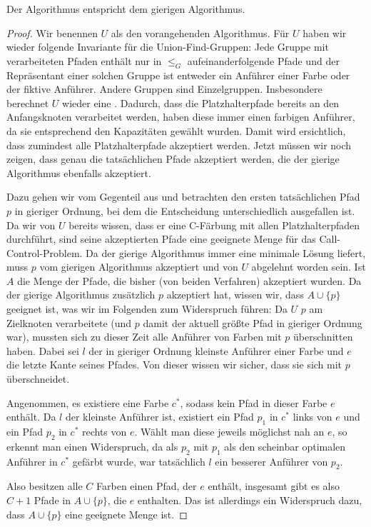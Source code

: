 \begin{lemma}
    Der  Algorithmus entspricht dem gierigen Algorithmus.
\end{lemma}
\begin{proof}
    Wir benennen $U$ als den vorangehenden Algorithmus.
    Für $U$ haben wir wieder folgende Invariante für die Union-Find-Gruppen:
    Jede Gruppe mit verarbeiteten Pfaden enthält nur in $\leq_G$ aufeinanderfolgende Pfade und der Repräsentant einer
    solchen Gruppe ist entweder ein Anführer einer Farbe oder der fiktive Anführer.
    Andere Gruppen sind Einzelgruppen.
    Insbesondere berechnet $U$ wieder eine .
    Dadurch, dass die Platzhalterpfade bereits an den Anfangsknoten verarbeitet werden, haben diese immer einen farbigen
    Anführer, da sie entsprechend den Kapazitäten gewählt wurden.
    Damit wird ersichtlich, dass zumindest alle Platzhalterpfade akzeptiert werden.
    Jetzt müssen wir noch zeigen, dass genau die tatsächlichen Pfade akzeptiert werden, die der gierige Algorithmus
    ebenfalls akzeptiert.

    Dazu gehen wir vom Gegenteil aus und betrachten den ersten tatsächlichen Pfad $p$ in gieriger Ordnung, bei dem die
    Entscheidung unterschiedlich ausgefallen ist.
    Da wir von $U$ bereits wissen, dass er eine C-Färbung mit allen Platzhalterpfaden durchführt, sind
    seine akzeptierten Pfade eine geeignete Menge für das Call-Control-Problem.
    Da der gierige Algorithmus immer eine minimale Lösung liefert, muss $p$ vom gierigen Algorithmus akzeptiert und von
    $U$ abgelehnt worden sein.
    Ist $A$ die Menge der Pfade, die bisher (von beiden Verfahren) akzeptiert wurden.
    Da der gierige Algorithmus zusätzlich $p$ akzeptiert hat, wissen wir, dass $A \cup \{p\}$ geeignet ist, was wir
    im Folgenden zum Widerspruch führen:
    Da $U$ $p$ am Zielknoten verarbeitete (und $p$ damit der aktuell größte Pfad in gieriger Ordnung
    war), mussten sich zu dieser Zeit alle Anführer von Farben mit $p$ überschnitten haben.
    Dabei sei $l$ der in gieriger Ordnung kleinste Anführer einer Farbe und $e$ die letzte Kante seines Pfades.
    Von dieser wissen wir sicher, dass sie sich mit $p$ überschneidet.

    Angenommen, es existiere eine Farbe $c^*$, sodass kein Pfad in dieser Farbe $e$ enthält. Da $l$ der kleinste Anführer
    ist, existiert ein Pfad $p_1$ in $c^*$ links von $e$ und ein Pfad $p_2$ in $c^*$ rechts von $e$.
    Wählt man diese jeweils möglichst nah an $e$, so erkennt man einen Widerspruch, da als $p_2$ mit $p_1$ als den
    scheinbar optimalen Anführer in $c^*$ gefärbt wurde, war tatsächlich $l$ ein besserer Anführer von $p_2$.

    Also besitzen alle $C$ Farben einen Pfad, der $e$ enthält, insgesamt gibt es also $C+1$ Pfade in $A \cup \{p\}$, die
    $e$ enthalten. Das ist allerdings ein Widerspruch dazu, dass $A \cup \{p\}$ eine geeignete Menge ist.
\end{proof}













